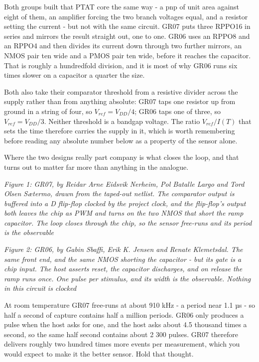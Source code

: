 Both groups built that PTAT core the same way - a pnp of unit area
against eight of them, an amplifier forcing the two branch voltages
equal, and a resistor setting the current - but not with the same
circuit. GR07 puts three RPPO16 in series and mirrors the result
straight out, one to one. GR06 uses an RPPO8 and an RPPO4 and then
divides its current down through two further mirrors, an NMOS pair ten
wide and a PMOS pair ten wide, before it reaches the capacitor. That is
roughly a hundredfold division, and it is most of why GR06 runs six
times slower on a capacitor a quarter the size.

Both also take their comparator threshold from a resistive divider
across the supply rather than from anything absolute: GR07 taps one
resistor up from ground in a string of four, so \(V_{ref} = V_{DD}/4\);
GR06 taps one of three, so \(V_{ref} = V_{DD}/3\). Neither threshold is
a bandgap voltage. The ratio \(V_{ref}/I(T)\) that sets the time
therefore carries the supply in it, which is worth remembering before
reading any absolute number below as a property of the sensor alone.

Where the two designs really part company is what closes the loop, and
that turns out to matter far more than anything in the analogue.


{
\centering
{}
}

\emph{Figure 1: GR07, by Reidar Arne Eidsvik Nerheim, Pol Batalle Largo
and Tord Olsen Sætermo, drawn from the taped-out netlist. The comparator
output is buffered into a D flip-flop clocked by the project clock, and
the flip-flop's output both leaves the chip as PWM and turns on the two
NMOS that short the ramp capacitor. The loop closes through the chip, so
the sensor free-runs and its period is the observable}


{
\centering
{}
}

\emph{Figure 2: GR06, by Gabin Sbaffi, Erik K. Jensen and Renate
Klemetsdal. The same front end, and the same NMOS shorting the capacitor
- but its gate is a chip input. The host asserts reset, the capacitor
discharges, and on release the ramp runs once. One pulse per stimulus,
and its width is the observable. Nothing in this circuit is clocked}

At room temperature GR07 free-runs at about 910 kHz - a period near 1.1
µs - so half a second of capture contains half a million periods. GR06
only produces a pulse when the host asks for one, and the host asks
about 4.5 thousand times a second, so the same half second contains
about 2 300 pulses. GR07 therefore delivers roughly two hundred times
more events per measurement, which you would expect to make it the
better sensor. Hold that thought.

